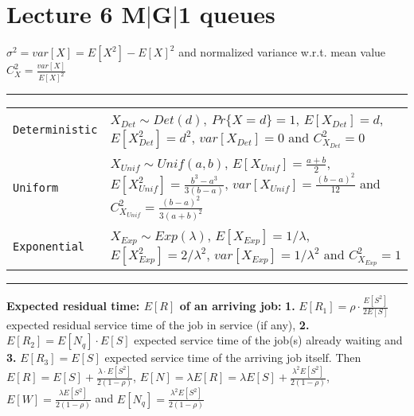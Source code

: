 \section{Lecture 6 M$|$G$|$1 queues}
$\sigma^{2} = var[X] = E[X^{2}] - E[X]^{2}$ and normalized variance w.r.t. mean value $C_{X}^{2} = \frac{var[X]}{E[X]^{2}}$

\hrule
{}
\begin{tabular}{@{}p{\the\MyLen}@{}p{\linewidth-\the\MyLen}@{}}
\verb!Deterministic!	& $X_{Det} \sim Det(d),\ Pr\{X=d\} = 1$, $E[X_{Det}] = d$, $E[X_{Det}^{2}] = d^{2}$, $var[X_{Det}] = 0$ and $C_{X_{Det}}^{2} = 0$\\
\verb!Uniform!	& $X_{Unif} \sim Unif(a, b)$, $E[X_{Unif}] = \frac{a+b}{2}$, $E[X_{Unif}^{2}] = \frac{b^3 - a^3}{3(b-a)}$, $var[X_{Unif}] = \frac{(b-a)^{2}}{12}$ and $C_{X_{Unif}}^{2} = \frac{(b-a)^{2}}{3(a+b)^{2}}$\\
\verb!Exponential!	& $X_{Exp} \sim Exp(\lambda)$, $E[X_{Exp}] = 1/\lambda$, $E[X_{Exp}^{2}] = 2/\lambda^{2}$, $var[X_{Exp}] = 1/\lambda^{2}$ and $C_{X_{Exp}}^{2} = 1$\\
\end{tabular}
\hrule

\textbf{Expected residual time: $E[R]$ of an arriving job:}
\textbf{1.} $E[R_{1}] = \rho \cdot \frac{E[S^{2}]}{2E[S]}$ expected residual service time of the job in service (if any), \textbf{2.} $E[R_{2}] = E[N_{q}] \cdot E[S]$ expected service time of the job(s) already waiting and \textbf{3.} $E[R_{3}] = E[S]$ expected service time of the arriving job itself. Then $E[R] = E[S] + \frac{\lambda \cdot E[S^{2}]}{2(1-\rho)}$, $E[N] = \lambda E[R] = \lambda E[S] + \frac{\lambda^{2} E[S^{2}]}{2(1-\rho)}$, $E[W] = \frac{\lambda E[S^{2}]}{2(1-\rho)}$ and $E[N_ {q}] = \frac{\lambda^{2} E[S^{2}]}{2(1-\rho)}$
